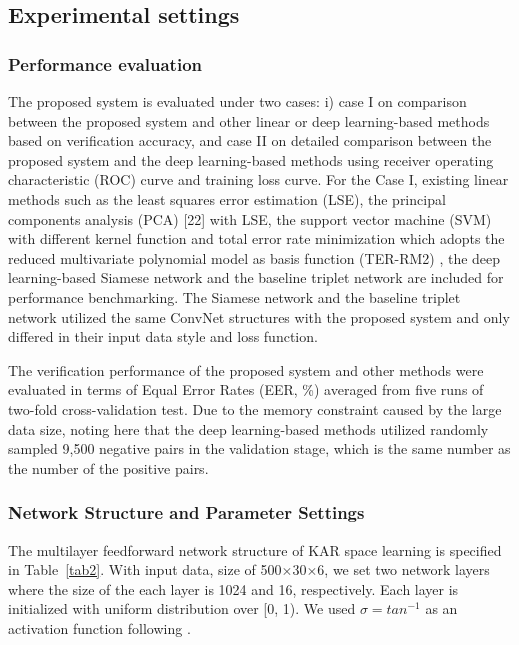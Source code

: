 \documentclass[runningheads]{llncs}
\begin{document}
\subsection{Experimental settings}

\subsubsection{Performance evaluation}
The proposed system is evaluated under two cases: i) case I on comparison between the proposed system and other linear or deep learning-based methods based on verification accuracy, and case II on detailed comparison between the proposed system and the deep learning-based methods using receiver operating characteristic (ROC) curve and training loss curve. For the Case I, existing linear methods such as the least squares error estimation (LSE), the principal components analysis (PCA) [22] with LSE, the support vector machine (SVM) with different kernel function and total error rate minimization which adopts the reduced multivariate polynomial model as basis function (TER-RM2) \cite{toh2003fingerprint,toh2008between}, the deep learning-based Siamese network \cite{koch2015siamese} and the baseline triplet network \cite{hoffer2015deep} are included for performance benchmarking. The Siamese network and the baseline triplet network utilized the same ConvNet structures with the proposed system and only differed in their input data style and loss function.

The verification performance of the proposed system and other methods were evaluated in terms of Equal Error Rates (EER, \%) averaged from five runs of two-fold cross-validation test. Due to the memory constraint caused by the large data size, noting here that the deep learning-based methods utilized randomly sampled 9,500 negative pairs in the validation stage, which is the same number as the number of the positive pairs.

\subsubsection{Network Structure and Parameter Settings}
The multilayer feedforward network structure of KAR space learning is specified in Table~\ref{tab2}. With input data, size of 500$\times$30$\times$6, we set two network layers where the size of the each layer is 1024 and 16, respectively. Each layer is initialized with uniform distribution over [0, 1). We used $\sigma = {tan}^{-1}$ as an activation function following \cite{toh2018analytic}.
\end{document}
